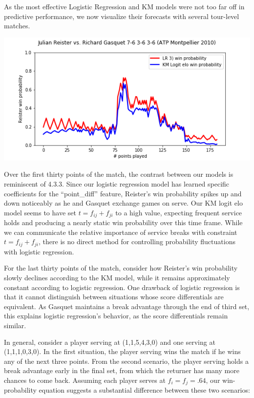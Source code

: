 \documentclass[chapterprefix=false]{report}
\begin{document}
As the most effective Logistic Regression and KM models were not too far off in predictive performance, we now visualize their forecasts with several tour-level matches. 

\includegraphics[scale=.7]{reister_gasquet}

Over the first thirty points of the match, the contrast between our models is reminiscent of 4.3.3. Since our logistic regression model has learned specific coefficients for the ``point\_diff'' feature, Reister's win probability spikes up and down noticeably as he and Gasquet exchange games on serve. Our KM logit elo model seems to have set $t = f_{ij} + f_{ji}$ to a high value, expecting frequent service holds and producing a nearly static win probability over this time frame. While we can communicate the relative importance of service breaks with constraint $t=f_{ij}+f_{ji}$, there is no direct method for controlling probability fluctuations with logistic regression.

For the last thirty points of the match, consider how Reister's win probability slowly declines according to the KM model, while it remains approximately constant according to logistic regression. One drawback of logistic regression is that it cannot distinguish between situations whose score differentials are equivalent. As Gasquet  maintains a break advantage through the end of third set, this explains logistic regression's behavior, as the score differentials remain similar.

In general, consider a player serving at (1,1,5,4,3,0) and one serving at (1,1,1,0,3,0). In the first situation, the player serving wins the match if he wins any of the next three points. From the second scenario, the player serving holds a break advantage early in the final set, from which the returner has many more chances to come back. Assuming each player serves at $f_i=f_j=.64$, our win-probability equation suggests a substantial difference between these two scenarios:
\end{document}
